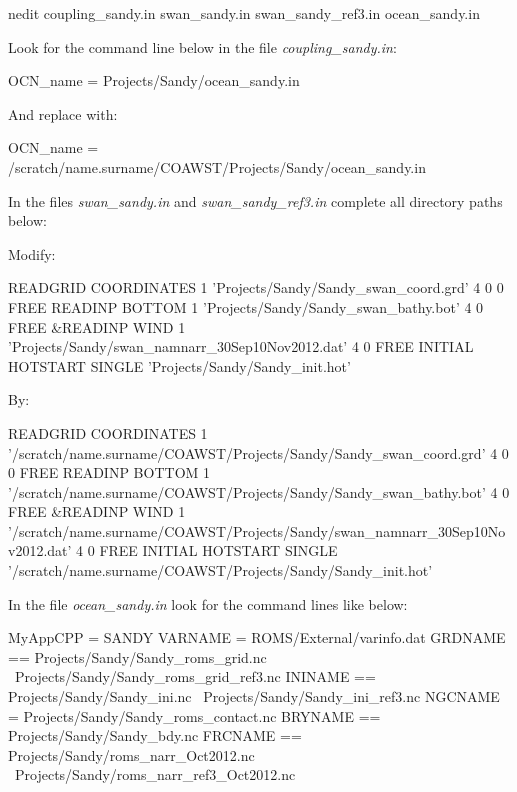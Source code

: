 \begin{bashcode}
nedit coupling_sandy.in swan_sandy.in swan_sandy_ref3.in ocean_sandy.in
\end{bashcode}
\bigskip

\noindent Look for the command line below in the file \textit{coupling\_sandy.in}:
\bigskip

\begin{bashcode}
OCN_name = Projects/Sandy/ocean_sandy.in
\end{bashcode}
\bigskip

\noindent And replace with:
\bigskip

\begin{bashcode}
OCN_name = /scratch/name.surname/COAWST/Projects/Sandy/ocean_sandy.in
\end{bashcode}
\bigskip

\noindent In the files \textit{swan\_sandy.in} and \textit{swan\_sandy\_ref3.in} complete all directory paths below:
\bigskip

\noindent Modify:
\bigskip

\begin{bashcode}
READGRID COORDINATES 1 'Projects/Sandy/Sandy_swan_coord.grd' 4 0 0 FREE
READINP BOTTOM 1 'Projects/Sandy/Sandy_swan_bathy.bot' 4 0 FREE
&READINP WIND 1 'Projects/Sandy/swan_namnarr_30Sep10Nov2012.dat' 4 0 FREE
INITIAL HOTSTART SINGLE 'Projects/Sandy/Sandy_init.hot'
\end{bashcode}
\bigskip

\noindent By:
\bigskip

\begin{bashcode}[fontsize=\scriptsize]
READGRID COORDINATES 1 '/scratch/name.surname/COAWST/Projects/Sandy/Sandy_swan_coord.grd' 4 0 0 FREE
READINP BOTTOM 1 '/scratch/name.surname/COAWST/Projects/Sandy/Sandy_swan_bathy.bot' 4 0 FREE
&READINP WIND 1 '/scratch/name.surname/COAWST/Projects/Sandy/swan_namnarr_30Sep10Nov2012.dat' 4 0 FREE
INITIAL HOTSTART SINGLE '/scratch/name.surname/COAWST/Projects/Sandy/Sandy_init.hot'
\end{bashcode}
\bigskip

\noindent In the file \textit{ocean\_sandy.in} look for the command lines like below:
\bigskip

\begin{bashcode}
MyAppCPP = SANDY
VARNAME  = ROMS/External/varinfo.dat
GRDNAME == Projects/Sandy/Sandy_roms_grid.nc \
           Projects/Sandy/Sandy_roms_grid_ref3.nc
ININAME == Projects/Sandy/Sandy_ini.nc \
           Projects/Sandy/Sandy_ini_ref3.nc
NGCNAME =  Projects/Sandy/Sandy_roms_contact.nc
BRYNAME == Projects/Sandy/Sandy_bdy.nc
FRCNAME == Projects/Sandy/roms_narr_Oct2012.nc \
           Projects/Sandy/roms_narr_ref3_Oct2012.nc
\end{bashcode}
\bigskip

